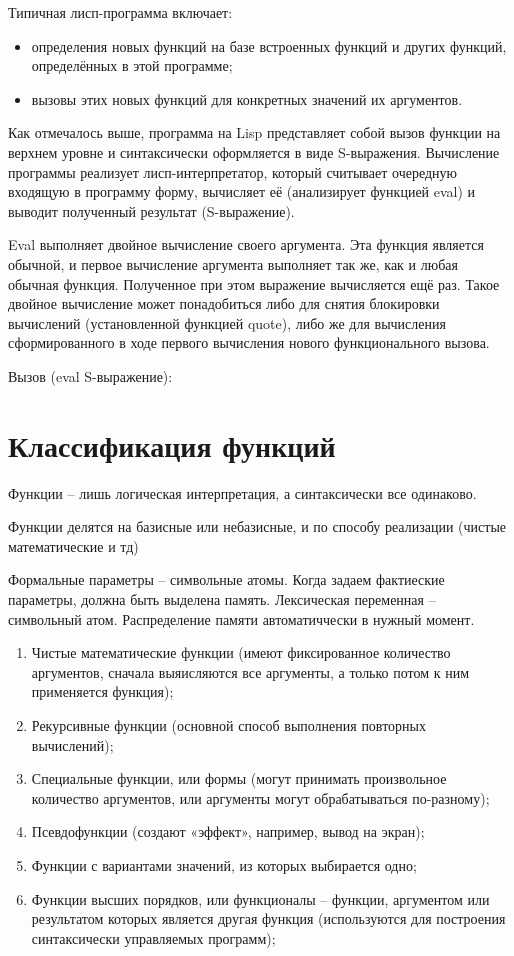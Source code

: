 \documentclass{article}
\begin{document}
Типичная лисп-программа включает:
\begin{itemize}
	\item определения новых функций на базе встроенных функций и других функций, определённых в этой программе;
	\item {вызовы этих новых функций для конкретных значений их аргументов.}
\end{itemize}

Как отмечалось выше, программа на Lisp представляет собой вызов функции на верхнем уровне и синтаксически оформляется в виде S-выражения. Вычисление программы реализует лисп-интерпретатор, который считывает очередную входящую в программу форму, вычисляет её (анализирует функцией eval) и выводит полученный результат (S-выражение).

Eval выполняет двойное  вычисление своего аргумента. Эта функция является обычной, и первое  вычисление аргумента выполняет так же, как и любая обычная функция.  Полученное при этом выражение вычисляется ещё раз. Такое двойное  вычисление может понадобиться либо для снятия блокировки вычислений (установленной функцией quote), либо же для вычисления сформированного в ходе первого вычисления нового функционального вызова.


Вызов (eval S-выражение):


\section*{Классификация функций}


Функции -- лишь логическая интерпретация, а синтаксически все одинаково.

Функции делятся на базисные или небазисные, и по способу реализации (чистые математические и тд)

Формальные параметры -- символьные атомы. Когда задаем фактиеские параметры, должна быть выделена память. Лексическая переменная -- символьный атом. Распределение памяти автоматиччески в нужный момент.



\begin{enumerate}
	\item Чистые  математические функции (имеют фиксированное количество аргументов, сначала выяисляются все аргументы, а только потом к ним применяется функция);
	\item Рекурсивные функции (основной способ выполнения повторных вычислений);
	\item Специальные функции, или формы (могут принимать произвольное количество аргументов, или аргументы могут обрабатываться по-разному);
	\item Псевдофункции (создают «эффект», например, вывод на экран);
	\item Функции с вариантами значений, из которых выбирается одно;
	\item Функции высших порядков, или функционалы --  функции, аргументом или  результатом которых является другая функция (используются для построения синтаксически управляемых программ);
\end{enumerate}
\end{document}
